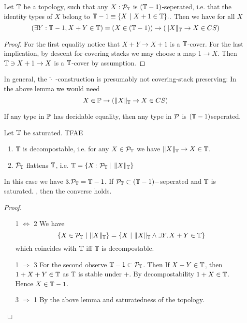 \begin{lemma}
	Let $\mathbb{T}$ be a topology, such that any $X : \mathcal{P}_{\mathbb{T}}$ is $(\mathbb{T}-1)$-seperated, i.e. that the identity types of $X$ belong to $\mathbb{T}-1  \equiv \{X \ | \ X + 1 \in \mathbb{T}\}.$. Then we have for all $X$
	\[
	(\exists Y : \mathbb{T} - 1 , X + Y \in \mathbb{T}) = (X \in (\mathbb{T} - 1)) \to (\|X\|_{\mathbb{T}} \to X \in CS)
	\]
\end{lemma}
\begin{proof}
	For the first equality notice that $X + Y \to X + 1$ is a $\mathbb{T}$-cover. For the last implication, by descent for covering stacks we may choose a map $1 \to X$. Then $\mathbb{T} \ni X + 1 \to X$ is a $\mathbb{T}$-cover by assumption.
\end{proof}
\begin{warning}
	In general, the $\tilde \cdot$ -construction is presumably not covering-stack preserving: In the above lemma we would need 
	\[
	X \in \mathbb{P} \to (\|X\|_{\mathbb{T}} \to X \in CS)
	\]
\end{warning}

\begin{example}
	If any type in $\mathbb{P}$ has decidable equality, then any type in $\mathcal{P}$ is $(\mathbb{T}-1)$seperated.
\end{example}
\begin{prop}{\label{prop:detectDecompostable}}
Let $\mathbb{T}$ be saturated. TFAE
	\begin{enumerate}
		\item  $\mathbb{T}$ is decompostable, i.e. for any $X \in \mathcal{P}_{\mathbb{T}}$ we have $\|X\|_{\mathbb{T}} \to X \in \mathbb{T}$.
		\item $\mathcal{P}_{\mathbb{T}}$ flattens $\mathbb{T}$, i.e. $\mathbb{T} = \{X : \mathcal{P}_{\mathbb{T}} \ | \ \|X\|_{\mathbb{T}} \}$ %
	\end{enumerate}
	In this case we have  $3 . \mathcal{P}_{\mathbb{T}} = \mathbb{T} - 1$. If $\mathcal{P}_{\mathbb{T}} \subset (\mathbb{T}-1)-$seperated and $\mathbb{T}$ is saturated.  , then the converse holds.
\end{prop}
\begin{proof}
	\ \begin{itemize}
			\item [1 $\Leftrightarrow$ 2]
		We have
		\[
		\{X \in \mathcal{P}_{\mathbb{T}} \ | \ \|X \|_{\mathbb{T}}\} = \{ X \ | \ \|X\|_{\mathbb{T}} \land \exists Y , X + Y \in \mathbb{T} \}
		\] %
		which coincides with $\mathbb{T}$ iff $\mathbb{T}$ is decompostable.
	\item [1 $\Rightarrow$ 3]
	For the second observe $\mathbb{T} - 1 \subset \mathcal{P}_{\mathbb{T}}$. Then If $X + Y \in \mathbb{T}$, then $1 + X + Y \in \mathbb{T}$ as $\mathbb{T}$ is stable under $+$. By decompostability $1 + X \in \mathbb{T}$. Hence $X \in \mathbb{T} - 1$. %
	\item [3 $\Rightarrow$ 1]
	By the above lemma and saturatedness of the topology.

\end{itemize}	
\end{proof}

